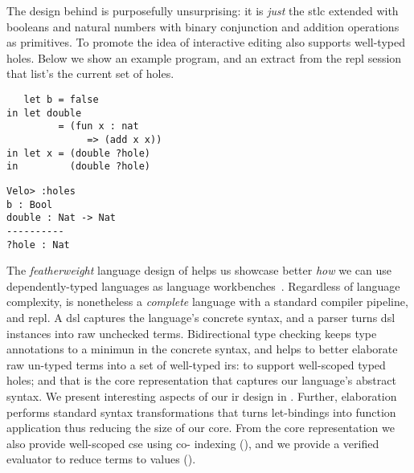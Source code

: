 The design behind \Velo{} is purposefully unsurprising:
%
it is \emph{just} the \ac{stlc} extended with booleans and natural numbers with binary conjunction and addition operations as primitives.
%
To promote the idea of interactive editing \Velo{} also supports well-typed holes.
%
Below we show an example \Velo{} program, and an extract from the \acs*{repl} session that list's the current set of holes.

\begin{center}
  \begin{minipage}[t]{0.45\linewidth}
\begin{Verbatim}
   let b = false
in let double
         = (fun x : nat
              => (add x x))
in let x = (double ?hole)
in         (double ?hole)
\end{Verbatim}
\end{minipage}
\hfill
  \begin{minipage}[t]{0.45\linewidth}
    \begin{Verbatim}
Velo> :holes
b : Bool
double : Nat -> Nat
----------
?hole : Nat
\end{Verbatim}
\end{minipage}

\end{center}

The \emph{featherweight} language design of \Velo{} helps us showcase better \emph{how} we can use dependently-typed languages as language workbenches~\cite{DBLP:journals/toplas/IgarashiPW01}.
%
Regardless of language complexity, \Velo{} is nonetheless a \emph{complete} language with a standard compiler pipeline, and \acs*{repl}.
%
A \ac{dsl} captures the language's concrete syntax, and a parser turns \ac{dsl} instances into raw unchecked terms.
%
Bidirectional type checking keeps type annotations to a minimun in the concrete syntax, and helps to better elaborate raw un-typed terms into a set of well-typed \acp{ir}:
%
 to support well-scoped typed holes;
%
and
%
 that is the core representation that captures our language's abstract syntax.
%
We present interesting aspects of our \ac{ir} design in .
%
Further, elaboration performs standard syntax transformations that turns let-bindings into function application thus reducing the size of our core.
%
From the core representation we also provide well-scoped \ac{cse} using co-\DeBruijn{} indexing (), and we provide a verified evaluator to reduce terms to values ().

